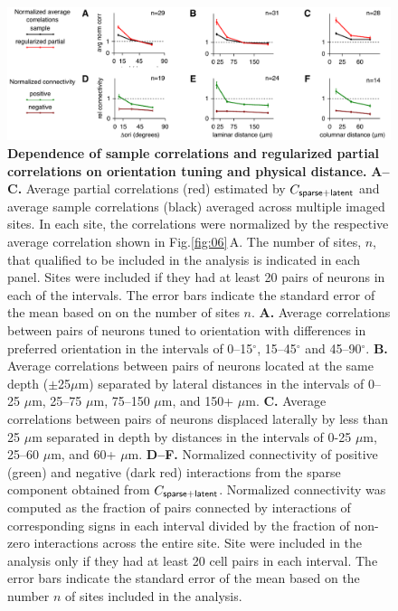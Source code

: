 \documentclass[10pt]{article}
\begin{document}
\begin{figure}[!ht]
    \begin{center}
        \includegraphics{./figures/Figure07.pdf}
    \end{center}
    \caption{{\bf Dependence of sample correlations and regularized partial correlations on orientation tuning and physical distance.}
    {\bf A--C.} Average partial correlations (red) estimated by $C_{\sf sparse+latent}$ and average sample correlations (black) averaged across multiple imaged sites. In each site, the correlations were normalized by the respective average correlation shown in Fig.\;\ref{fig:06}\,A.  The number of sites, $n$, that qualified to be included in the analysis is indicated in each panel. Sites were included if they had at least 20 pairs of neurons in each of the intervals. The error bars indicate the standard error of the mean based on on the number of sites $n$.
    {\bf A.} Average correlations between pairs of neurons tuned to orientation with differences in preferred orientation in the intervals of 0--15$^\circ$, 15--45$^\circ$ and 45--90$^\circ$. 
    {\bf B.} Average correlations between pairs of neurons located at the same depth ($\pm$25$\mu$m) separated by lateral distances in the intervals of 0--25 $\mu$m, 25--75 $\mu$m, 75--150 $\mu$m, and 150+ $\mu$m.
    {\bf C.} Average correlations between pairs of neurons displaced laterally by less than 25 $\mu$m separated in depth by distances in the intervals of 0-25 $\mu$m, 25--60 $\mu$m, and 60+ $\mu$m.
    {\bf D--F.} Normalized connectivity of positive (green) and negative (dark red) interactions from the sparse component obtained from $C_{\sf sparse+latent}$. Normalized connectivity was computed as the fraction of pairs connected by interactions of corresponding signs in each interval divided by the fraction of non-zero interactions across the entire site. Site were included in the analysis only if they had at least 20 cell pairs in each interval. The error bars indicate the standard error of the mean based on the number $n$ of sites included in the analysis.
}
\label{fig:07}
\end{figure}
\end{document}

